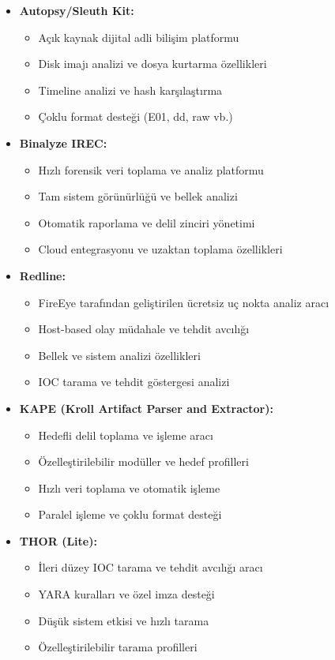 \begin{itemize}
\begin{itemize}
    \item \textbf{Autopsy/Sleuth Kit:}
    \begin{itemize}
        \item Açık kaynak dijital adli bilişim platformu
        \item Disk imajı analizi ve dosya kurtarma özellikleri
        \item Timeline analizi ve hash karşılaştırma
        \item Çoklu format desteği (E01, dd, raw vb.)
    \end{itemize}

    \item \textbf{Binalyze IREC:}
    \begin{itemize}
        \item Hızlı forensik veri toplama ve analiz platformu
        \item Tam sistem görünürlüğü ve bellek analizi
        \item Otomatik raporlama ve delil zinciri yönetimi
        \item Cloud entegrasyonu ve uzaktan toplama özellikleri
    \end{itemize}

    \item \textbf{Redline:}
    \begin{itemize}
        \item FireEye tarafından geliştirilen ücretsiz uç nokta analiz aracı
        \item Host-based olay müdahale ve tehdit avcılığı
        \item Bellek ve sistem analizi özellikleri
        \item IOC tarama ve tehdit göstergesi analizi
    \end{itemize}

    \item \textbf{KAPE (Kroll Artifact Parser and Extractor):}
    \begin{itemize}
        \item Hedefli delil toplama ve işleme aracı
        \item Özelleştirilebilir modüller ve hedef profilleri
        \item Hızlı veri toplama ve otomatik işleme
        \item Paralel işleme ve çoklu format desteği
    \end{itemize}

    \item \textbf{THOR (Lite):}
    \begin{itemize}
        \item İleri düzey IOC tarama ve tehdit avcılığı aracı
        \item YARA kuralları ve özel imza desteği
        \item Düşük sistem etkisi ve hızlı tarama
        \item Özelleştirilebilir tarama profilleri
    \end{itemize}
\end{itemize}


\end{itemize}
